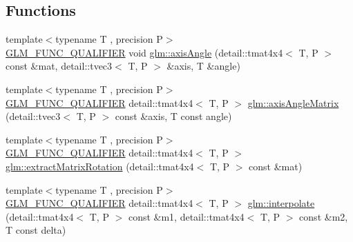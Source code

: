 \subsection*{Functions}
\begin{DoxyCompactItemize}
\item 
{\footnotesize template$<$typename T , precision P$>$ }\\\hyperlink{setup_8hpp_a33fdea6f91c5f834105f7415e2a64407}{G\+L\+M\+\_\+\+F\+U\+N\+C\+\_\+\+Q\+U\+A\+L\+I\+F\+I\+ER} void \hyperlink{group__gtx__matrix__interpolation_gadf049332345bf754b63fe24a914f8fac}{glm\+::axis\+Angle} (detail\+::tmat4x4$<$ T, P $>$ const \&mat, detail\+::tvec3$<$ T, P $>$ \&axis, T \&angle)
\item 
{\footnotesize template$<$typename T , precision P$>$ }\\\hyperlink{setup_8hpp_a33fdea6f91c5f834105f7415e2a64407}{G\+L\+M\+\_\+\+F\+U\+N\+C\+\_\+\+Q\+U\+A\+L\+I\+F\+I\+ER} detail\+::tmat4x4$<$ T, P $>$ \hyperlink{group__gtx__matrix__interpolation_gafc6982aa7c8e8198b21f038f51fc4b90}{glm\+::axis\+Angle\+Matrix} (detail\+::tvec3$<$ T, P $>$ const \&axis, T const angle)
\item 
{\footnotesize template$<$typename T , precision P$>$ }\\\hyperlink{setup_8hpp_a33fdea6f91c5f834105f7415e2a64407}{G\+L\+M\+\_\+\+F\+U\+N\+C\+\_\+\+Q\+U\+A\+L\+I\+F\+I\+ER} detail\+::tmat4x4$<$ T, P $>$ \hyperlink{group__gtx__matrix__interpolation_gacb1e3e76c1710d89a1852d87d58c021e}{glm\+::extract\+Matrix\+Rotation} (detail\+::tmat4x4$<$ T, P $>$ const \&mat)
\item 
{\footnotesize template$<$typename T , precision P$>$ }\\\hyperlink{setup_8hpp_a33fdea6f91c5f834105f7415e2a64407}{G\+L\+M\+\_\+\+F\+U\+N\+C\+\_\+\+Q\+U\+A\+L\+I\+F\+I\+ER} detail\+::tmat4x4$<$ T, P $>$ \hyperlink{group__gtx__matrix__interpolation_gad7dbb702234767be1b4d3c191a2327ac}{glm\+::interpolate} (detail\+::tmat4x4$<$ T, P $>$ const \&m1, detail\+::tmat4x4$<$ T, P $>$ const \&m2, T const delta)
\end{DoxyCompactItemize}
